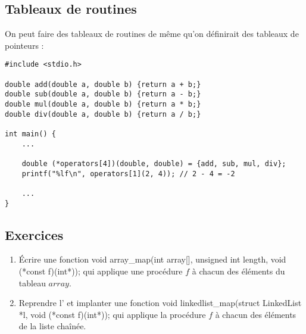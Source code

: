 \documentclass[../../../main.tex]{subfiles}
\begin{document}
\subsection{Tableaux de routines}
\label{sub:tableaux_de_routines}
On peut faire des tableaux de routines de même qu'on définirait des tableaux de pointeurs :
\begin{verbatim}
#include <stdio.h>

double add(double a, double b) {return a + b;}
double sub(double a, double b) {return a - b;}
double mul(double a, double b) {return a * b;}
double div(double a, double b) {return a / b;}

int main() {
	...

	double (*operators[4])(double, double) = {add, sub, mul, div};
	printf("%lf\n", operators[1](2, 4)); // 2 - 4 = -2
	
	...
}
\end{verbatim}
\subsection{Exercices}
\begin{enumerate}
	\item Écrire une fonction \textsf{void array\_map(int array[], unsigned int length, void (*const f)(int*));} qui applique une procédure $f$ à chacun des éléments du tableau $array$.
	\item Reprendre l' et implanter une fonction \textsf{void linkedlist\_map(struct LinkedList *l, void (*const f)(int*));} qui applique la procédure $f$ à chacun des éléments de la liste chaînée.
\end{enumerate}
\end{document}
